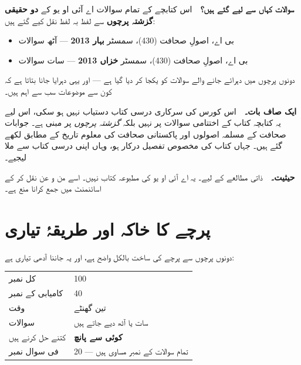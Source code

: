 \begin{tcolorbox}[enhanced, colback=white, colframe=bmblue, boxrule=0.6pt,
                  arc=3pt, left=12pt, right=12pt, top=10pt, bottom=10pt]
\textbf{\color{bmblue}سوالات کہاں سے لیے گئے ہیں؟}\ \
اس کتابچے کے تمام سوالات اے آئی او یو کے \textbf{دو حقیقی گزشتہ پرچوں} سے
لفظ بہ لفظ نقل کیے گئے ہیں:

\smallskip
\begin{itemize}\setlength{\itemsep}{0pt}\setlength{\topsep}{2pt}
  \item بی اے، اصولِ صحافت (\textenglish{430})، سمسٹر \textbf{بہار
        \textenglish{2013}} --- آٹھ سوالات
  \item بی اے، اصولِ صحافت (\textenglish{430})، سمسٹر \textbf{خزاں
        \textenglish{2013}} --- سات سوالات
\end{itemize}

\smallskip
دونوں پرچوں میں دہرائے جانے والے سوالات کو یکجا کر دیا گیا ہے --- اور یہی
دہرایا جانا بتاتا ہے کہ کون سے موضوعات سب سے اہم ہیں۔

\medskip
\textbf{\color{bmblue}ایک صاف بات۔}\ \
اس کورس کی سرکاری درسی کتاب دستیاب نہیں ہو سکی، اس لیے یہ کتابچہ کتاب کے
اختتامی سوالات پر نہیں بلکہ \emph{گزشتہ پرچوں} پر مبنی ہے۔ جوابات صحافت کے
مسلمہ اصولوں اور پاکستانی صحافت کی معلوم تاریخ کے مطابق لکھے گئے ہیں۔ جہاں
کتاب کی مخصوص تفصیل درکار ہو، وہاں اپنی درسی کتاب سے ملا لیجیے۔

\medskip
\textbf{\color{bmblue}حیثیت۔}\ \
ذاتی مطالعے کے لیے۔ یہ اے آئی او یو کی مطبوعہ کتاب نہیں۔ اسے من و عن نقل کر کے
اسائنمنٹ میں جمع کرانا منع ہے۔
\end{tcolorbox}

\clearpage

\section*{پرچے کا خاکہ اور طریقۂ تیاری}

دونوں پرچوں سے پرچے کی ساخت بالکل واضح ہے، اور یہ جاننا آدھی تیاری ہے:

\medskip
\begin{center}
\begin{tabular}{@{}p{4.6cm} p{9.8cm}@{}}
\toprule
کل نمبر & \textenglish{100} \\
کامیابی کے نمبر & \textenglish{40} \\
وقت & تین گھنٹے \\
سوالات & سات یا آٹھ دیے جاتے ہیں \\
کتنے حل کرنے ہیں & \textbf{کوئی سے پانچ} \\
فی سوال نمبر & \textenglish{20} --- تمام سوالات کے نمبر مساوی ہیں \\
\bottomrule
\end{tabular}
\end{center}

